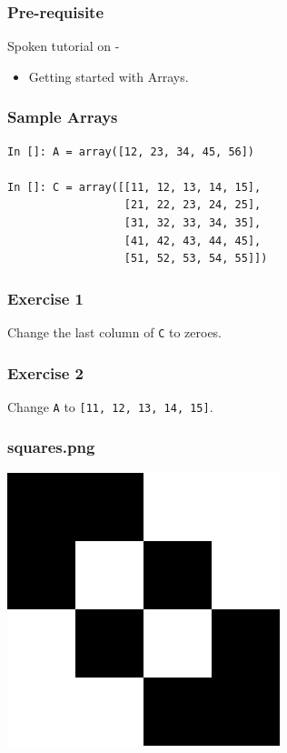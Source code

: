 \documentclass[17pt,compress]{beamer}
\begin{document}
\begin{frame}
\frametitle{Pre-requisite}
\label{sec-3}


Spoken tutorial on -
\begin{itemize}
\item Getting started with Arrays.
\end{itemize}
\end{frame}
\begin{frame}[fragile]
\frametitle{Sample Arrays}
\label{sec-4}
\lstset{language=Python}
\begin{footnotesize}
\begin{lstlisting}
In []: A = array([12, 23, 34, 45, 56])

In []: C = array([[11, 12, 13, 14, 15],
                  [21, 22, 23, 24, 25],
                  [31, 32, 33, 34, 35],
                  [41, 42, 43, 44, 45],
                  [51, 52, 53, 54, 55]])
\end{lstlisting}
\end{footnotesize}
\end{frame}
\begin{frame}
\frametitle{Exercise 1}
\label{sec-5}

  Change the last column of \texttt{C} to zeroes. 
\end{frame}
\begin{frame}
\frametitle{Exercise 2}
\label{sec-6}

  Change \texttt{A} to \texttt{[11, 12, 13, 14, 15]}. 
\end{frame}
\begin{frame}
\frametitle{squares.png}
\label{sec-7}

    \begin{center}
      \includegraphics[scale=0.6]{squares.png}    
    \end{center}
\end{frame}
\end{document}
